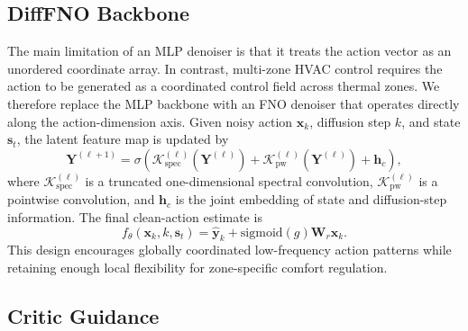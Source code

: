 \documentclass[conference]{IEEEtran}
\theoremstyle{nonumberplain}
\theoremstyle{plain}
\begin{document}
\subsection{DiffFNO Backbone}

The main limitation of an MLP denoiser is that it treats the action vector as an unordered coordinate array. In contrast, multi-zone HVAC control requires the action to be generated as a coordinated control field across thermal zones. We therefore replace the MLP backbone with an FNO denoiser that operates directly along the action-dimension axis. Given noisy action $\mathbf{x}_k$, diffusion step $k$, and state $\mathbf{s}_t$, the latent feature map is updated by
\begin{equation}
    \mathbf{Y}^{(\ell+1)} =
    \sigma\!\left(
    \mathcal{K}_{\mathrm{spec}}^{(\ell)}(\mathbf{Y}^{(\ell)}) +
    \mathcal{K}_{\mathrm{pw}}^{(\ell)}(\mathbf{Y}^{(\ell)}) +
    \mathbf{h}_c
    \right),
    \label{eq:spectral_layer}
\end{equation}
where $\mathcal{K}_{\mathrm{spec}}^{(\ell)}$ is a truncated one-dimensional spectral convolution, $\mathcal{K}_{\mathrm{pw}}^{(\ell)}$ is a pointwise convolution, and $\mathbf{h}_c$ is the joint embedding of state and diffusion-step information. The final clean-action estimate is
\begin{equation}
    f_{\theta}(\mathbf{x}_k,k,\mathbf{s}_t)=
    \hat{\mathbf{y}}_k + \mathrm{sigmoid}(g)\mathbf{W}_r\mathbf{x}_k.
    \label{eq:final_denoiser}
\end{equation}
This design encourages globally coordinated low-frequency action patterns while retaining enough local flexibility for zone-specific comfort regulation.

\subsection{Critic Guidance}
\end{document}
